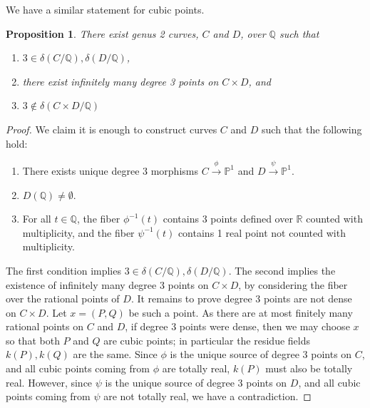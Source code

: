 \documentclass[a4paper,11pt]{amsart}
\theoremstyle{plain}
\newtheorem{prop}[thm]{Proposition}
\theoremstyle{remark}
\newcommand{\dendegs}{\delta}
\begin{document}
We have a similar statement for cubic points.


\begin{prop}
    There exist genus 2 curves, $C$ and $D$, over $\mathbb{Q}$ such that \begin{enumerate}
        \item $3 \in \dendegs(C / \mathbb{Q}), \dendegs(D / \mathbb{Q})$,
        \item there exist infinitely many degree 3 points on $C \times D$, and
        \item $3 \notin \dendegs(C \times D / \mathbb{Q})$
    \end{enumerate}
\end{prop}
\begin{proof}
    We claim it is enough to construct curves $C$ and $D$ such that the following hold:
    \begin{enumerate}[label = (\roman*)]
        \item There exists unique degree $3$ morphisms $C\xrightarrow{\phi}\mathbb{P}^1$ and $D\xrightarrow{\psi}\mathbb{P}^1$.
        \item $D(\mathbb{Q}) \neq \emptyset$.
        \item For all $t \in \mathbb{Q}$, the fiber $\phi^{-1}(t)$ contains 3 points defined over $\mathbb{R}$ counted with multiplicity, and the fiber $\psi^{-1}(t)$ contains 1 real point not counted with multiplicity.
    \end{enumerate}

    The first condition implies $3 \in \dendegs(C / \mathbb{Q}), \dendegs(D / \mathbb{Q})$. The second implies the existence of infinitely many degree 3 points on $C \times D$, by considering the fiber over the rational points of $D$. It remains to prove degree 3 points are not dense on $C \times D$. Let $x=(P,Q)$ be such a point. 
    As there are at most finitely many rational points on $C$ and $D$, if degree 3 points were dense, then we may choose $x$ so that both $P$ and $Q$ are cubic points; in particular the residue fields $k(P), k(Q)$ are the same.  
    Since $\phi$ is the unique source of degree 3 points on $C$, and all cubic points coming from $\phi$ are totally real, $k(P)$ must also be totally real. However, since $\psi$ is the unique source of degree 3 points on $D$, and all cubic points coming from $\psi$ are not totally real, we have a contradiction. 


\end{proof}
\end{document}
